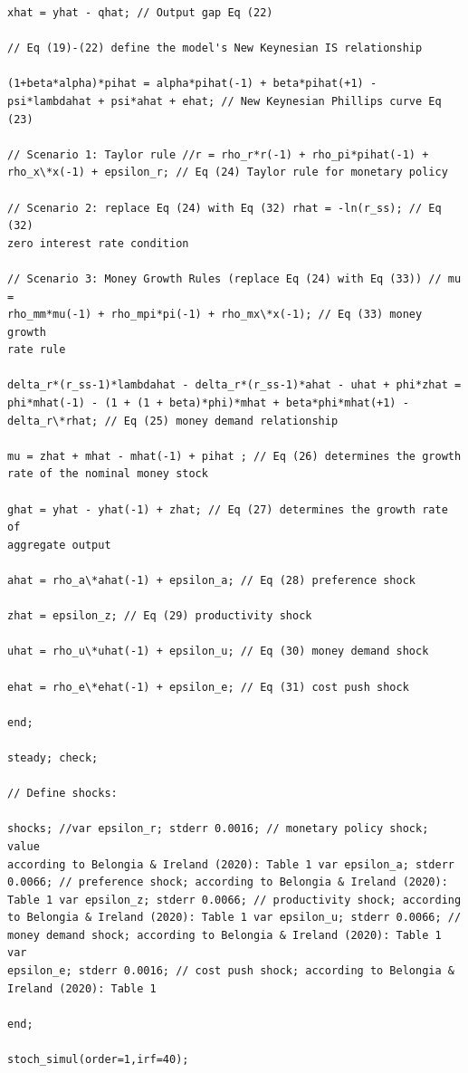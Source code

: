 \documentclass[11pt,preprint, authoryear]{elsarticle}
\numberwithin{equation}{section}
\numberwithin{figure}{section}
\numberwithin{table}{section}
\begin{document}
\begin{verbatim}
xhat = yhat - qhat; // Output gap Eq (22)

// Eq (19)-(22) define the model's New Keynesian IS relationship

(1+beta*alpha)*pihat = alpha*pihat(-1) + beta*pihat(+1) -
psi*lambdahat + psi*ahat + ehat; // New Keynesian Phillips curve Eq (23)

// Scenario 1: Taylor rule //r = rho_r*r(-1) + rho_pi*pihat(-1) +
rho_x\*x(-1) + epsilon_r; // Eq (24) Taylor rule for monetary policy

// Scenario 2: replace Eq (24) with Eq (32) rhat = -ln(r_ss); // Eq (32)
zero interest rate condition

// Scenario 3: Money Growth Rules (replace Eq (24) with Eq (33)) // mu =
rho_mm*mu(-1) + rho_mpi*pi(-1) + rho_mx\*x(-1); // Eq (33) money growth
rate rule

delta_r*(r_ss-1)*lambdahat - delta_r*(r_ss-1)*ahat - uhat + phi*zhat =
phi*mhat(-1) - (1 + (1 + beta)*phi)*mhat + beta*phi*mhat(+1) -
delta_r\*rhat; // Eq (25) money demand relationship

mu = zhat + mhat - mhat(-1) + pihat ; // Eq (26) determines the growth
rate of the nominal money stock

ghat = yhat - yhat(-1) + zhat; // Eq (27) determines the growth rate of
aggregate output

ahat = rho_a\*ahat(-1) + epsilon_a; // Eq (28) preference shock

zhat = epsilon_z; // Eq (29) productivity shock

uhat = rho_u\*uhat(-1) + epsilon_u; // Eq (30) money demand shock

ehat = rho_e\*ehat(-1) + epsilon_e; // Eq (31) cost push shock

end;

steady; check;

// Define shocks:

shocks; //var epsilon_r; stderr 0.0016; // monetary policy shock; value
according to Belongia & Ireland (2020): Table 1 var epsilon_a; stderr
0.0066; // preference shock; according to Belongia & Ireland (2020):
Table 1 var epsilon_z; stderr 0.0066; // productivity shock; according
to Belongia & Ireland (2020): Table 1 var epsilon_u; stderr 0.0066; //
money demand shock; according to Belongia & Ireland (2020): Table 1 var
epsilon_e; stderr 0.0016; // cost push shock; according to Belongia &
Ireland (2020): Table 1

end;

stoch_simul(order=1,irf=40);
\end{verbatim}
\end{document}
